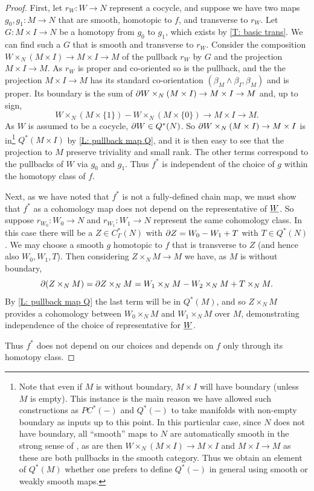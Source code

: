 \begin{proof}
First, let $r_W:W\to N$ represent a cocycle, and suppose we have two maps $g_0, g_1:M\to N$ that are smooth, homotopic to $f$, and transverse to $r_W$.
Let $G:M\times I\to N$ be a homotopy from $g_0$ to $g_1$, which exists by \cref{T: basic trans}. We can find such a $G$ that is  smooth and transverse to $r_W$. Consider the composition $W\times_N (M\times I)\to M\times I\to M$ of the pullback $r_W$ by $G$ and the projection $M\times I\to M$. As $r_W$ is proper and co-oriented so is the pullback, and the the projection $M\times I\to M$ has its standard co-orientation $(\beta_M\wedge \beta_I,\beta_M)$ and is proper.  Its boundary is the sum of $\partial W\times_N (M\times I)\to M\times I\to M$ and, up to sign, $$W\times_N (M\times \{1\}) - W\times_N(M\times \{0\})\to M\times I\to M.$$ As $W$ is assumed to be a cocycle, $\partial W\in Q^*(N)$. So $\partial W\times_N (M\times I)\to M\times I$ is in\footnote{Note that even if $M$ is without boundary, $M\times I$ will have boundary (unless $M$ is empty). This instance is the main reason we have allowed such constructions as $PC^*(-)$ and $Q^*(-)$ to take manifolds with non-empty boundary as inputs up to this point. In this particular case, since $N$ does not have boundary, all ``smooth'' maps to $N$ are automatically smooth in the strong sense of \cite{Joy12}, as are then $W\times_N (M\times I)\to M\times I$ and $M\times I\to M$ as these are both pullbacks in the smooth category. Thus we obtain an element of $Q^*(M)$ whether one prefers to define $Q^*(-)$ in general using smooth or weakly smooth maps.} $Q^*(M\times I)$ by \cref{L: pullback map Q}, and it is then easy to see that the projection to $M$ preserve triviality and small rank. The other terms correspond to the pullbacks of $W$ via $g_0$ and $g_1$. Thus $f^*$ is independent of the choice of $g$ within the homotopy class of $f$.

Next, as we have noted that $f^*$ is not a fully-defined chain map, we must show that $f^*$ as a cohomology map does not depend on the representative of  $\underline{W}$. So suppose $r_{W_0}:W_0\to N$ and $r_{W_1}:W_1\to N$ represent the same cohomology class. In this case there will be a $Z\in C^*_\Gamma(N)$ with $\partial Z=W_0-W_1+T$ with $T\in Q^*(N)$. We may choose a smooth $g$ homotopic to $f$ that is transverse to $Z$ (and hence also $W_0,W_1, T$). Then considering $Z\times_N M\to M$ we have, as $M$ is without boundary,
$$\partial(Z\times_N M)=\partial Z\times_N M=W_1\times_N M -W_2\times_N M+T\times_N M.$$
By \cref{L: pullback map Q} the last term will be in $Q^*(M)$, and so $Z\times_NM$ provides a cohomology between $W_0\times_NM$ and $W_1\times_NM$ over $M$, demonstrating independence of the choice of representative for $\underline{W}$.

Thus $f^*$ does not depend on our choices and depends on $f$ only through its homotopy class.
\end{proof}

